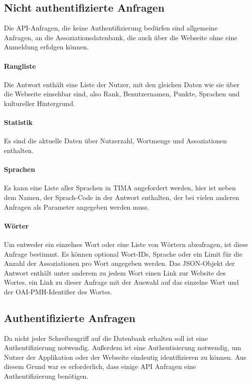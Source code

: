 \subsection{Nicht authentifizierte Anfragen}
Die API-Anfragen, die keine Authentifizierung bedürfen sind allgemeine Anfragen, an die Assoziationsdatenbank, die auch über die Webseite ohne eine Anmeldung erfolgen können.

\paragraph{Rangliste} Die Antwort enthält eine Liste der Nutzer, mit den gleichen Daten wie sie über die Webseite einsehbar sind, also Rank, Benutzernamen, Punkte, Sprachen und kultureller Hintergrund.

\paragraph{Statistik} Es sind die aktuelle Daten über Nutzerzahl, Wortmenge und Assoziationen enthalten.

\paragraph{Sprachen} Es kann eine Liste aller Sprachen in TIMA angefordert werden, hier ist neben dem Namen, der Sprach-Code in der Antwort enthalten, der bei vielen anderen Anfragen als Parameter angegeben werden muss.

\paragraph{Wörter} Um entweder ein einzelnes Wort oder eine Liste von Wörtern abzufragen, ist diese Anfrage bestimmt. Es können optional Wort-IDs, Sprache oder ein Limit für die Anzahl der Assoziationen pro Wort angegeben werden. Das JSON-Objekt der Antwort enthält unter anderem zu jedem Wort einen Link zur Website des Wortes, ein Link zu dieser Anfrage mit der Auswahl auf das einzelne Wort und der OAI-PMH-Identifier des Wortes.

\subsection{Authentifizierte Anfragen}\label{subsec:authentifizierte_anfragen}
Da nicht jeder Schreibzugriff auf die Datenbank erhalten soll ist eine Authentifizierung notwendig. Außerdem ist eine Authentisierung notwendig, um Nutzer der Applikation oder der Webseite eindeutig identifizieren zu können. Aus diesem Grund war es erforderlich, dass einige API Anfragen eine Authentifizierung benötigen.

